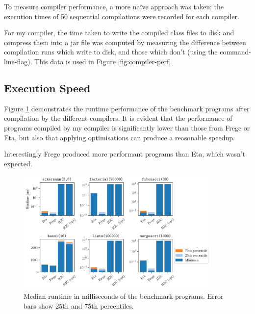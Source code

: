 \documentclass[dissertation.tex]{subfiles}
\begin{document}
{{        To measure compiler performance, a more naïve approach was taken: the execution times of 50 sequential
        compilations were recorded for each compiler.
        
        For my compiler, the time taken to write the compiled class files to disk and compress them into a jar file was
        computed by measuring the difference between compilation runs which write to disk, and those which don't (using
        the  command-line-flag). This data is used in Figure \ref{fig:compiler-perf}.

    }
    \subsection{Execution Speed}
    {


        Figure \ref{fig:perf} demonstrates the runtime performance of the benchmark programs after compilation by the
        different compilers. It is evident that the performance of programs compiled by my compiler is significantly
        lower than those from Frege or Eta, but also that applying optimisations can produce a reasonable speedup.

        Interestingly Frege produced more performant programs than Eta, which wasn't expected.

        \begin{figure}[h]
            \centering
            \captionsetup{width=0.8\textwidth}
            \includegraphics[width=0.9\textwidth]{graphs/perf.pdf}
            \caption{Median runtime in milliseconds of the benchmark programs. Error bars show 25th and 75th percentiles.}
            \label{fig:perf}
        

\end{figure}}}
\end{document}
